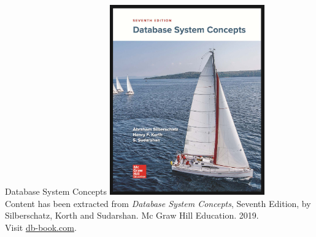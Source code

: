 \documentclass{beamer}
\begin{document}
% 
% 

\begin{frame}{Database System Concepts}
    \centering
    \includegraphics[width=0.5\textwidth]{figures/book_cover.jpg} \\
    \vspace{5mm}
    {
        \tiny
        Content has been extracted from \textit{Database System Concepts}, Seventh Edition, by Silberschatz, Korth and Sudarshan. Mc Graw Hill Education. 2019.\\
        Visit \href{https://db-book.com/}{db-book.com}.\\
    }
\end{frame}
\end{document}
